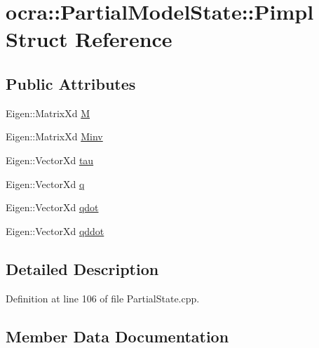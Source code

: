 \hypertarget{structocra_1_1PartialModelState_1_1Pimpl}{}\section{ocra\+:\+:Partial\+Model\+State\+:\+:Pimpl Struct Reference}
\label{structocra_1_1PartialModelState_1_1Pimpl}
\subsection*{Public Attributes}
\begin{DoxyCompactItemize}
\item 
Eigen\+::\+Matrix\+Xd \hyperlink{structocra_1_1PartialModelState_1_1Pimpl_aac1b2af908cd347c7c295d0461f605b7}{M}
\item 
Eigen\+::\+Matrix\+Xd \hyperlink{structocra_1_1PartialModelState_1_1Pimpl_a8fc2e9335c4fc0ff753fdb9850ad7bd5}{Minv}
\item 
Eigen\+::\+Vector\+Xd \hyperlink{structocra_1_1PartialModelState_1_1Pimpl_a74798b71925f4049758733f78a6cd571}{tau}
\item 
Eigen\+::\+Vector\+Xd \hyperlink{structocra_1_1PartialModelState_1_1Pimpl_a1533bd101072998a086254a0bdd9b9e9}{q}
\item 
Eigen\+::\+Vector\+Xd \hyperlink{structocra_1_1PartialModelState_1_1Pimpl_afaef50e83183344243397f3001f25c26}{qdot}
\item 
Eigen\+::\+Vector\+Xd \hyperlink{structocra_1_1PartialModelState_1_1Pimpl_a5a7b9332901dfbde222881933efe9a0d}{qddot}
\end{DoxyCompactItemize}


\subsection{Detailed Description}


Definition at line 106 of file Partial\+State.\+cpp.



\subsection{Member Data Documentation}
\hypertarget{structocra_1_1PartialModelState_1_1Pimpl_aac1b2af908cd347c7c295d0461f605b7}{}\label{structocra_1_1PartialModelState_1_1Pimpl_aac1b2af908cd347c7c295d0461f605b7} 
